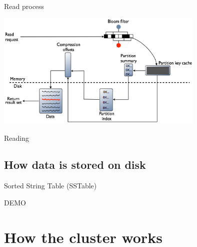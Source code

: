 \documentclass[
  10pt
]{beamer}
\begin{document}
\begin{frame}{Read process}
  \begin{center}
    \includegraphics[width=0.75\textwidth]{resources/local_read.png}
  \end{center}

  Reading
\end{frame}

\subsection{How data is stored on disk}  %

\begin{frame}{Sorted String Table (SSTable)}
  \begin{center}
    \Huge DEMO
  \end{center}
\end{frame}

\section{How the cluster works}  %
\end{document}
